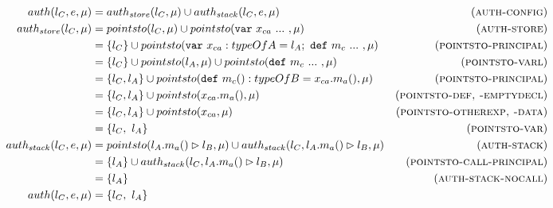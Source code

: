 \documentclass{llncs}
\newcommand{\keywadj}[1]{\mathtt{#1}}
\newcommand{\keyw}[1]{\keywadj{#1}~}
\begin{document}
\begin{align*}
auth(l_C, e, \mu) &= auth_{store}(l_C, \mu) \cup auth_{stack}(l_C, e, \mu) & (\textsc{auth-config})\\
auth_{store}(l_C, \mu) &= pointsto(l_C, \mu) \cup pointsto(\keyw{var} x_{ca}~...~, \mu) & (\textsc{auth-store})\\
 &= \{ l_C \} \cup pointsto(\keyw{var} x_{ca} : typeOfA = l_A;~\keyw{def} m_c~...~, \mu) & (\textsc{pointsto-principal})\\
 &= \{ l_C \} \cup pointsto(l_A, \mu) \cup pointsto(\keyw{def} m_c~...~, \mu) & (\textsc{pointsto-varl})\\
 &= \{ l_C, l_A \} \cup pointsto(\keyw{def} m_c() : typeOfB = x_{ca}.m_a(), \mu) & (\textsc{pointsto-principal})\\
 &= \{ l_C, l_A \} \cup pointsto(x_{ca}.m_a(), \mu) & (\textsc{pointsto-def, -emptydecl})\\
 &= \{ l_C, l_A \} \cup pointsto(x_{ca}, \mu) & (\textsc{pointsto-otherexp, -data})\\
 &= \{ l_C,~l_A \} & (\textsc{pointsto-var})\\
auth_{stack}(l_C, e, \mu) &= pointsto(l_A.m_a() \rhd l_B, \mu) \cup auth_{stack}(l_C, l_A.m_a() \rhd l_B, \mu) & (\textsc{auth-stack})\\
 &= \{ l_A \} \cup auth_{stack}(l_C, l_A.m_a() \rhd l_B, \mu) & (\textsc{pointsto-call-principal})\\
 &= \{ l_A \} & (\textsc{auth-stack-nocall})\\
auth(l_C, e, \mu) &=  \{ l_C,~l_A\}&\\
\end{align*}





\end{document}
